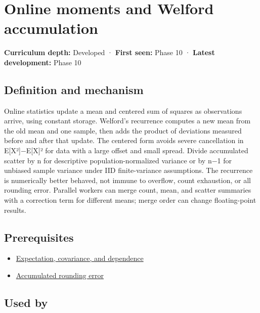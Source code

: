 \hypertarget{appendix-33237f0f618b}{}\label{referencestart:appendix-33237f0f618b}
\section{Online moments and Welford accumulation}\label{appendix-33237f0f618b-online-moments-and-welford-accumulation}

\textbf{Curriculum depth:} Developed · \textbf{First seen:} Phase 10 · \textbf{Latest development:} Phase 10

\subsection{Definition and mechanism}\label{appendix-33237f0f618b-definition-and-mechanism}

Online statistics update a mean and centered sum of squares as observations arrive, using constant storage. Welford's recurrence computes a new mean from the old mean and one sample, then adds the product of deviations measured before and after that update. The centered form avoids severe cancellation in E{[}X²{]}−E{[}X{]}² for data with a large offset and small spread. Divide accumulated scatter by n for descriptive population-normalized variance or by n−1 for unbiased sample variance under IID finite-variance assumptions. The recurrence is numerically better behaved, not immune to overflow, count exhaustion, or all rounding error. Parallel workers can merge count, mean, and scatter summaries with a correction term for different means; merge order can change floating-point results.

\subsection{Prerequisites}\label{appendix-33237f0f618b-prerequisites}

\begin{itemize}
\tightlist
\item
  \hyperref[appendix-54c383df9992]{Expectation, covariance, and dependence}
\item
  \hyperref[appendix-f82e270791c8]{Accumulated rounding error}
\end{itemize}

\subsection{Used by}\label{appendix-33237f0f618b-used-by}

